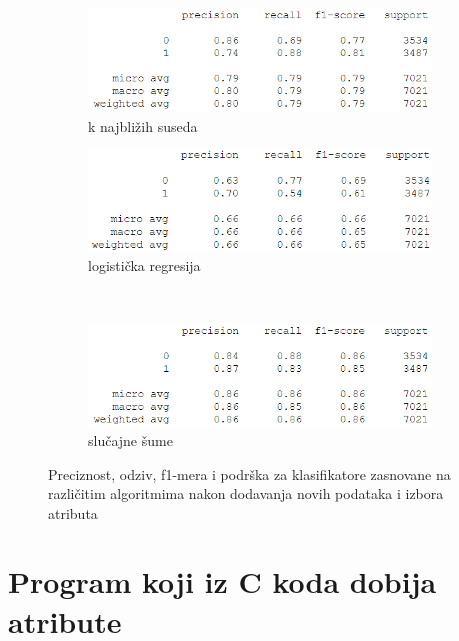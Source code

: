 \documentclass[12pt,oneside]{memoir}
\begin{document}
\begin{figure}[!ht]
    \centering
    \begin{subfigure}[b]{0.45\textwidth}
        \centering
        \includegraphics[width=\textwidth]{knn_final}
        \caption{k najbližih suseda}
        \label{fig:kn_final}
    \end{subfigure}
    \begin{subfigure}[b]{0.45\textwidth}
        \centering
        \includegraphics[width=\textwidth]{logreg_final.png}
        \caption{logistička regresija}
        \label{fig:logreg_final}
    \end{subfigure}
    \\
    \begin{subfigure}[b]{0.45\textwidth}
        \centering
        \includegraphics[width=\textwidth]{randfor_final}
        \caption{slučajne šume}
        \label{fig:randfor_final}
    \end{subfigure}
    \caption{Preciznost, odziv, f1-mera i podrška za klasifikatore zasnovane na različitim algoritmima nakon dodavanja novih podataka i izbora atributa}
    \label{fig:dodatno3}
\end{figure}

% 

\section{Program koji iz C koda dobija atribute}
\label{sec:program atributi}
\end{document}
